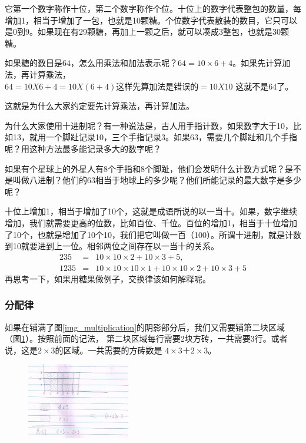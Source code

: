 它第一个数字称作十位，第二个数字称作个位。十位上的数字代表整包的数量，每增加1，相当于增加了一包，也就是10颗糖。个位数字代表散装的数目，它只可以是0到9。如果现在有29颗糖，再加上一颗之后，就可以凑成3整包，也就是30颗糖。

如果糖的数目是64，怎么用乘法和加法表示呢？$64=10\times6+4$。如果先计算加法，再计算乘法，
    $64=10X6+4
        =10X(6+4)  这样先算加法是错误的
        =10X10$  这就不是64了。
    
 这就是为什么大家约定要先计算乘法，再计算加法。

 为什么大家使用十进制呢？有一种说法是，古人用手指计数，如果数字大于10，比如13，就用一个脚趾记录10，三个手指记录3。如果63，需要几个脚趾和几个手指呢？用这种方法最多能记录多大的数字呢？

 如果有个星球上的外星人有8个手指和8个脚趾，他们会发明什么计数方式呢？是不是叫做八进制？他们的63相当于地球上的多少呢？他们所能记录的最大数字是多少呢？

  十位上增加1，相当于增加了10个，这就是成语所说的以一当十。如果，数字继续增加，我们就需要更高的位数，比如百位、千位。百位的增加1，相当于十位增加了10个，也就是增加了10个10，我们把它叫做一百（100）。所谓十进制，就是计数到10就要进到上一位。相邻两位之间存在以一当十的关系。
    \begin{eqnarray}
    235 &=& 10\times10\times2 + 10\times3 + 5, \\
    1235 &=& 10\times10\times10\times1 + 10\times10\times2 + 10\times3 + 5
    \end{eqnarray}
  再思考一下，如果用糖果做例子，交换律该如何解释呢。

\subsubsection{分配律}

如果在铺满了图\ref{img_multiplication}的阴影部分后，我们又需要铺第二块区域（图\ref{img_distributive}）。按照前面的记法，	第二块区域每行需要2块方砖，一共需要3行。或者说，这是$2\times3$的区域。一共需要的方砖数是
$4\times3＋2\times3$。

\begin{figure}[h]
    \center
    \includegraphics[width=0.4\textwidth]{multiplication_res/distributive} 
    \caption{}
    \label{img_distributive}
\end{figure}

